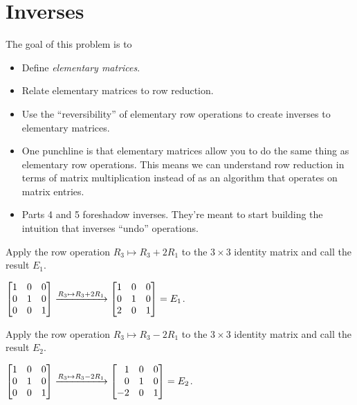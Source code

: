 \documentclass{workbook}
\newcommand{\bookonlynewpage}{\begin{bookonly}\newpage\end{bookonly}}
\begin{document}
\begin{slide}
	\bookonlynewpage
\section*{Inverses}

	\question
	\begin{annotation}
		\begin{goals}

			The goal of this problem is to
			\begin{itemize}
				\item Define \emph{elementary matrices}.
				\item Relate elementary matrices to row reduction.
				\item Use the ``reversibility'' of elementary row
					operations to create inverses to elementary matrices.
			\end{itemize}
		\end{goals}

		\begin{notes}
			\begin{itemize}
				\item One punchline is that elementary matrices
					allow you to do the same thing as elementary row
					operations. This means we can understand row
					reduction in terms of matrix multiplication instead
					of as an algorithm that operates on matrix entries.
				\item Parts 4 and 5 foreshadow inverses. They're meant to start
					building the intuition that inverses ``undo'' operations.
			\end{itemize}
		\end{notes}
	\end{annotation}
	\begin{parts}
		\item Apply the row operation $R_3\mapsto R_3+2R_1$ to the $3\times 3$ identity
		matrix and call the result $E_1$.
			\begin{solution}
				$\mat{1&0&0\\0&1&0\\0&0&1} \xrightarrow{R_3\mapsto R_3+2R_1} \mat{1&0&0\\0&1&0\\2&0&1}=E_1$.
			\end{solution}
		\item Apply the row operation $R_3\mapsto R_3-2R_1$ to the $3\times 3$ identity
		matrix and call the result $E_2$.
			\begin{solution}
				$\mat{1&0&0\\0&1&0\\0&0&1} \xrightarrow{R_3\mapsto R_3-2R_1} \mat{1&0&0\\0&1&0\\-2&0&1}=E_2$.
			\end{solution}
	\end{parts}


\end{slide}
\end{document}
